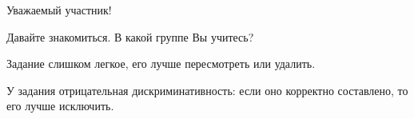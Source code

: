 
\newpage
{}

\begin{question}
Уважаемый участник!



Давайте знакомиться. В какой группе Вы учитесь?


\end{question}
\begin{recommendations}
Задание слишком легкое, его лучше пересмотреть или удалить.

У задания отрицательная дискриминативность: если оно корректно составлено, то его лучше исключить.

\end{recommendations}
